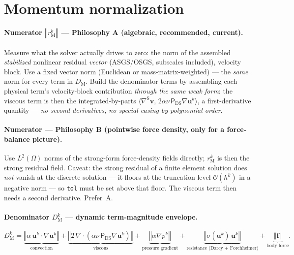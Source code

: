 \documentclass[11pt]{article}
\newcommand{\DSPi}{\mathsf{P}_{\mathrm{DS}}}  %
\newcommand{\bu}{\boldsymbol{u}}
\newcommand{\bv}{\boldsymbol{v}}
\newcommand{\bef}{\boldsymbol{f}}
\newcommand{\grad}{\nabla}
\newcommand{\divg}{\nabla\!\cdot\!}
\newcommand{\norm}[1]{\left\Vert #1\right\Vert}
\newcommand{\bigOh}{\mathcal{O}}
\newcommand{\rM}{r_{\mathrm M}}
\newcommand{\DM}{D_{\mathrm M}}
\theoremstyle{plain}
\theoremstyle{remark}
\begin{document}
\section{Momentum normalization}\label{sec:momentum}

\paragraph{Numerator $\norm{\rM^k}$ --- Philosophy A (algebraic, recommended,
current).}
Measure what the solver actually drives to zero: the norm of the assembled
\emph{stabilized} nonlinear residual \emph{vector} (ASGS/OSGS, subscales
included), velocity block. Use a fixed vector norm (Euclidean or
mass-matrix-weighted) --- the \emph{same} norm for every term in $\DM$. Build the
denominator terms by assembling each physical term's velocity-block contribution
\emph{through the same weak form}: the viscous term is then the
integrated-by-parts $\langle\grad^{\mathrm S}\bv,\,2\alpha\nu\,\DSPi\grad\bu^k\rangle$,
a first-derivative quantity --- \emph{no second derivatives, no special-casing by
polynomial order}.

\paragraph{Numerator --- Philosophy B (pointwise force density, only for a
force-balance picture).}
Use $L^2(\Omega)$ norms of the strong-form force-density fields directly;
$\rM^k$ is then the strong residual field. Caveat: the strong residual of a
finite element solution does \emph{not} vanish at the discrete solution --- it
floors at the truncation level $\bigOh(h^k)$ in a negative norm --- so
\texttt{tol} must be set above that floor. The viscous term then needs a second
derivative. Prefer~A.

\paragraph{Denominator $\DM^k$ --- dynamic term-magnitude envelope.}
\begin{equation}\label{eq:DM}
  \DM^k=
    \underbrace{\norm{\alpha\,\bu^k\!\cdot\!\grad\bu^k}}_{\mathrm{convection}}
    +\underbrace{\norm{2\,\divg(\alpha\nu\,\DSPi\grad\bu^k)}}_{\mathrm{viscous}}
    +\underbrace{\norm{\alpha\grad p^k}}_{\text{pressure gradient}}
    +\underbrace{\norm{\sigma(\bu^k)\,\bu^k}}_{\text{resistance (Darcy + Forchheimer)}}
    +\underbrace{\norm{\bef}}_{\text{body force}}.
\end{equation}
\end{document}
